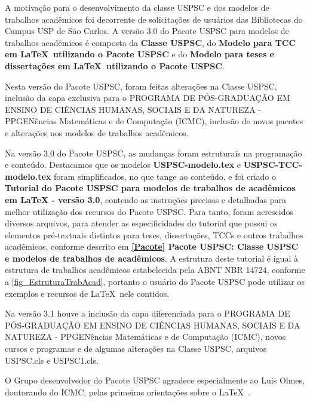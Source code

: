 \begin{agradecimentos}
	A motiva\c{c}\~ao para o desenvolvimento da classe USPSC e dos modelos de trabalhos acad\^emicos foi decorrente de solicita\c{c}\~oes de usu\'arios das Bibliotecas do Campus USP de S\~ao Carlos. A vers\~ao 3.0 do Pacote USPSC para modelos de trabalhos acad\^emicos \'e composta da \textbf{Classe USPSC}, do \textbf{Modelo para TCC em \LaTeX\ utilizando o Pacote USPSC} e do \textbf{Modelo para teses e disserta\c{c}\~oes em \LaTeX\ utilizando o Pacote USPSC}.
	
	Nesta vers\~ao do Pacote USPSC, foram feitas altera\c{c}\~oes na Classe USPSC, inclus\~ao da capa exclusiva para o PROGRAMA DE P\'OS-GRADUA\c{C}\~AO EM ENSINO DE CI\^ENCIAS HUMANAS, SOCIAIS E DA NATUREZA - PPGEN\^encias Matem\'aticas e de Computa\c{c}\~ao (ICMC), inclus\~ao de novos pacotes e altera\c{c}\~oes nos modelos de trabalhos acad\^emicos.
	
	Na vers\~ao 3.0 do Pacote USPSC, as mudan\c{c}as foram estruturais na programa\c{c}\~ao e conte\'udo. Destacamos que os modelos \textbf{USPSC-modelo.tex} e \textbf{USPSC-TCC-modelo.tex} foram simplificados, no que tange ao conte\'udo, e foi criado o \textbf{Tutorial do Pacote USPSC para modelos de trabalhos de acad\^emicos em LaTeX - vers\~ao 3.0}, contendo as instru\c{c}\~oes precisas e detalhadas para melhor utiliza\c{c}\~ao dos recursos do Pacote USPSC. Para tanto, foram acrescidos diversos arquivos, para atender as especificidades do tutorial que possui os elementos pr\'e-textuais distintos para teses, disserta\c{c}\~oes, TCCs e outros trabalhos acad\^emicos, conforme descrito em  \textbf{\ref{Pacote} Pacote USPSC: Classe USPSC e modelos de trabalhos de acad\^emicos}. A estrutura deste tutorial \'e igual \`a  estrutura de trabalhos acad\^emicos estabelecida pela ABNT NBR 14724, conforme a \autoref{fig_EstruturaTrabAcad}, portanto o usu\'ario do Pacote USPSC pode utilizar os exemplos e recursos de \LaTeX\ nele contidos.	
	 
	Na vers\~ao 3.1 houve a inclus\~ao da capa diferenciada para o PROGRAMA DE P\'OS-GRADUA\c{C}\~AO EM ENSINO DE CI\^ENCIAS HUMANAS, SOCIAIS E DA NATUREZA - PPGEN\^encias Matem\'aticas e de Computa\c{c}\~ao (ICMC), novos cursos e programas e de algumas altera\c{c}\~oes na Classe USPSC, arquivos USPSC.cls e  USPSC1.cls.
	
	O Grupo desenvolvedor do Pacote USPSC agradece especialmente ao Luis Olmes, doutorando do ICMC, pelas primeiras orienta\c{c}\~oes sobre o \LaTeX\ . 
	

\end{agradecimentos}
